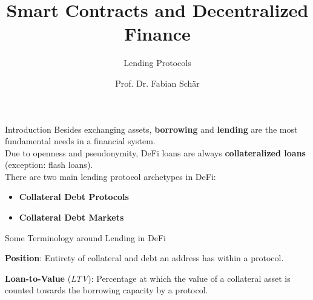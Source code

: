 \documentclass[handout]{beamer}
\title{Smart Contracts and Decentralized Finance}
\subtitle{Lending Protocols}
\author{Prof. Dr. Fabian Schär}
\institute{University of Basel}
\begin{document}
\thispagestyle{empty}
\begin{frame}[noframenumbering]
	\titlepage
\end{frame}

\begin{frame}{Introduction}
Besides exchanging assets, \textbf{borrowing} and \textbf{lending} are the most fundamental needs in a financial system. \\

\vspace{1em}
Due to openness and pseudonymity, DeFi loans are always \textbf{collateralized loans} (exception: flash loans).\\

\vspace{1em}
There are two main lending protocol archetypes in DeFi: 
\vspace{1em}
\begin{itemize}
  \item \textbf{Collateral Debt Protocols}
  \item \textbf{Collateral Debt Markets}
\end{itemize}
	
\end{frame}


\begin{frame}{Some Terminology around Lending in DeFi}

\vspace{1em}

		
			 {\textbf{Position}: Entirety of collateral and debt an address has within a protocol.}
			
\vspace{1em}

			
			  {\textbf{Loan-to-Value} (\textit{LTV}): Percentage at which the value of a collateral asset is counted towards the borrowing capacity by a protocol.}
			



\end{frame}
\end{document}

